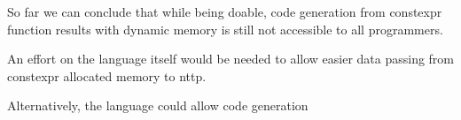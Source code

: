 \documentclass[../main]{subfiles}
\begin{document}
So far we can conclude that while being doable, code generation from \gls{constexpr}
function results with dynamic memory is still not accessible to all \cpp
programmers.

An effort on the language itself would be needed to allow easier data passing
from \gls{constexpr} allocated memory to \gls{nttp}.

Alternatively, the language could allow code generation
\end{document}

